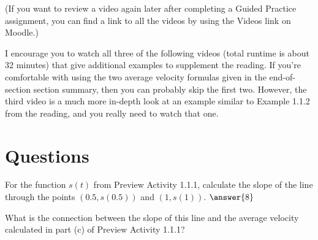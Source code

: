 \documentclass{ximera}
\begin{document}
(If you want to review a video again later after completing a Guided
Practice assignment, you can find a link to all the videos by using
the Videos link on Moodle.)

I encourage you to watch all three of the following videos (total
runtime is about 32 minutes) that give additional examples to
supplement the reading. If you're comfortable with using the two
average velocity formulas given in the end-of-section section summary, then
you can probably skip the first two. However, the third video is a
much more in-depth look at an example similar to Example 1.1.2 from the
reading, and you really need to watch that one.


\section*{Questions}

\begin{exercise}
  For the function $s(t)$ from Preview Activity 1.1.1, calculate the
  slope of the line through the points $(0.5,s(0.5))$ and
  $(1,s(1))$. $\answer{8}$
\end{exercise}

\begin{exercise}  
What is the connection between the slope of this line and the average velocity calculated in part (c) of Preview Activity 1.1.1?
  \begin{multipleChoice}  
  \end{multipleChoice}  
\end{exercise}
\end{document}
